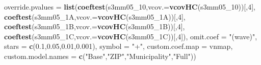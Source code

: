 \documentclass[
]{article}
\newenvironment{Shaded}{\begin{snugshade}}{\end{snugshade}}
\newcommand{\DataTypeTok}[1]{\textcolor[rgb]{0.13,0.29,0.53}{#1}}
\newcommand{\DecValTok}[1]{\textcolor[rgb]{0.00,0.00,0.81}{#1}}
\newcommand{\FloatTok}[1]{\textcolor[rgb]{0.00,0.00,0.81}{#1}}
\newcommand{\KeywordTok}[1]{\textcolor[rgb]{0.13,0.29,0.53}{\textbf{#1}}}
\newcommand{\NormalTok}[1]{#1}
\newcommand{\StringTok}[1]{\textcolor[rgb]{0.31,0.60,0.02}{#1}}
\begin{document}
\begin{Shaded}
\begin{Highlighting}[]
          \DataTypeTok{override.pvalues =} \KeywordTok{list}\NormalTok{(}\KeywordTok{coeftest}\NormalTok{(s3mm05_}\DecValTok{10}\NormalTok{,}\DataTypeTok{vcov.=}\KeywordTok{vcovHC}\NormalTok{(s3mm05_}\DecValTok{10}\NormalTok{))[,}\DecValTok{4}\NormalTok{],}
                                  \KeywordTok{coeftest}\NormalTok{(s3mm05_1A,}\DataTypeTok{vcov.=}\KeywordTok{vcovHC}\NormalTok{(s3mm05_1A))[,}\DecValTok{4}\NormalTok{],}
                                  \KeywordTok{coeftest}\NormalTok{(s3mm05_1B,}\DataTypeTok{vcov.=}\KeywordTok{vcovHC}\NormalTok{(s3mm05_1B))[,}\DecValTok{4}\NormalTok{],}
                                  \KeywordTok{coeftest}\NormalTok{(s3mm05_1C,}\DataTypeTok{vcov.=}\KeywordTok{vcovHC}\NormalTok{(s3mm05_1C))[,}\DecValTok{4}\NormalTok{]),}
          \DataTypeTok{omit.coef =} \StringTok{"(wave)"}\NormalTok{, }\DataTypeTok{stars =} \KeywordTok{c}\NormalTok{(}\FloatTok{0.1}\NormalTok{,}\FloatTok{0.05}\NormalTok{,}\FloatTok{0.01}\NormalTok{,}\FloatTok{0.001}\NormalTok{), }\DataTypeTok{symbol =} \StringTok{"+"}\NormalTok{,}
          \DataTypeTok{custom.coef.map =}\NormalTok{ vnmap, }
          \DataTypeTok{custom.model.names =} \KeywordTok{c}\NormalTok{(}\StringTok{"Base"}\NormalTok{,}\StringTok{"ZIP"}\NormalTok{,}\StringTok{"Municipality"}\NormalTok{,}\StringTok{"Full"}\NormalTok{))}
\end{Highlighting}
\end{Shaded}
\end{document}
